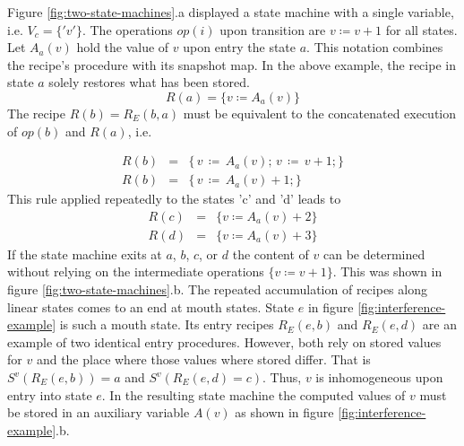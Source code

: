 \documentclass[12pt,a4paper]{scrartcl}
\begin{document}
Figure \ref{fig:two-state-machines}.a displayed a state machine with a single
variable, i.e. $V_c=\{'v'\}$. The operations $op(i)$ upon transition are
$v\coloneqq v+1$ for all states. Let $A_a(v)$ hold the value of $v$ upon entry the
state $a$.  This notation combines the recipe's procedure with its snapshot
map.  In the above example, the recipe in state $a$ solely restores what has
been stored.
\begin{equation} 
    R(a) = \{ v \coloneqq  A_a(v) \} 
\end{equation}
The recipe $R(b)=R_E(b,a)$ must be equivalent to the concatenated execution of $op(b)$
and $R(a)$, i.e.

\begin{eqnarray}
    R(b)&=&\{\,v\,\coloneqq \,A_a(v);\,v\,\coloneqq \,v + 1;\} \\
    R(b)&=&\{\,v\,\coloneqq \,A_a(v) + 1; \}                                 
\end{eqnarray}
This rule applied repeatedly to the states 'c' and 'd' leads to
\begin{eqnarray}
    R(c) &=&\{ v \coloneqq  A_a(v) + 2 \} \\
    R(d) &=&\{ v \coloneqq  A_a(v) + 3 \}                                 
\end{eqnarray}
If the state machine exits at $a$, $b$, $c$, or $d$ the content of $v$ can be
determined without relying on the intermediate operations $\{ v\coloneqq v+1 \}$. This
was shown in figure \ref{fig:two-state-machines}.b. 
The repeated accumulation of recipes along linear states comes to an end at
mouth states. State $e$ in figure \ref{fig:interference-example} is such a
mouth state. Its entry recipes $R_E(e,b)$ and $R_E(e,d)$ are an example of two
identical entry procedures. However, both rely on stored values for $v$ and the
place where those values where stored differ. That is $S^v(R_E(e,b))=a$ and
$S^v(R_E(e,d)=c)$. Thus, $v$ is inhomogeneous upon entry into state $e$.  In
the resulting state machine the computed values of $v$ must be stored in an
auxiliary variable $A(v)$ as shown in figure \ref{fig:interference-example}.b.
\end{document}
